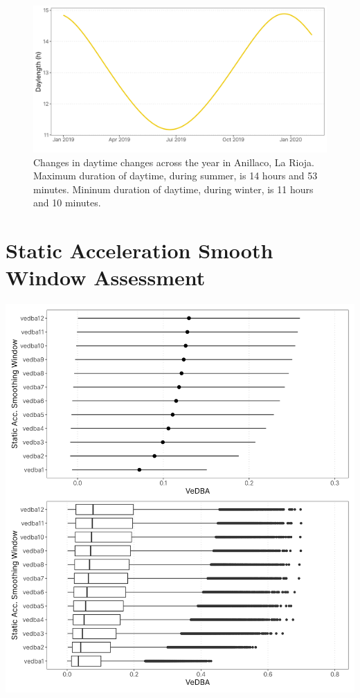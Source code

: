 \documentclass[english,msc,numbers,hidelinks]{coppe}
\begin{document}
  \begin{figure}

  {\centering \includegraphics[width=1\linewidth]{../04_figures/appendix/plot_daylength} 

  }

  \caption{Changes in daytime changes across the year in Anillaco, La Rioja. Maximum duration of daytime, during summer, is 14 hours and 53 minutes. Mininum duration of daytime, during winter, is 11 hours and 10 minutes.}\label{fig:appendix-daylenght}
  \end{figure}
  \hypertarget{static-acceleration-smooth-window-assessment}{%
  \chapter{Static Acceleration Smooth Window Assessment}\label{static-acceleration-smooth-window-assessment}}

  \newpage
  \begin{center}\includegraphics[width=1\linewidth]{../04_figures/appendix/plot_smoothing_window} \end{center}
\end{document}
